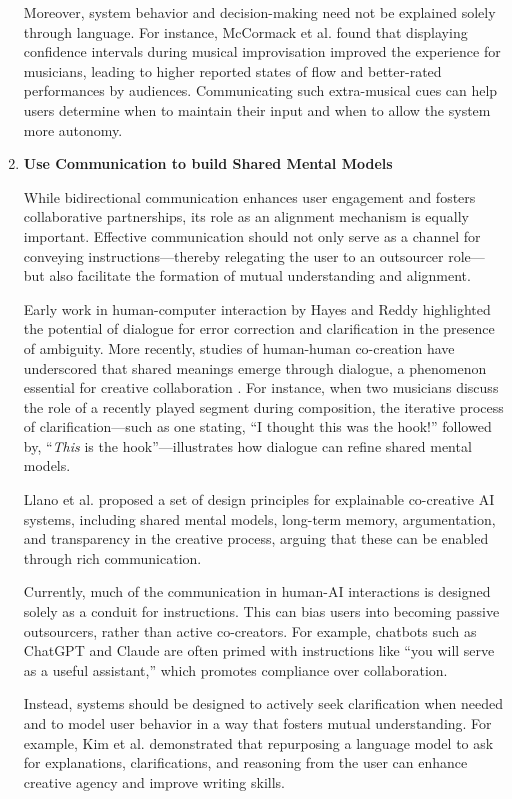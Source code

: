 \begin{enumerate}
Moreover, system behavior and decision-making need not be explained solely through language. For instance, McCormack et al. \cite{McCormack2019-yh} found that displaying confidence intervals during musical improvisation improved the experience for musicians, leading to higher reported states of flow and better-rated performances by audiences. Communicating such extra-musical cues can help users determine when to maintain their input and when to allow the system more autonomy.
    
\item \textbf{Use Communication to build Shared Mental Models}

While bidirectional communication enhances user engagement and fosters collaborative partnerships, its role as an alignment mechanism is equally important. Effective communication should not only serve as a channel for conveying instructions—thereby relegating the user to an outsourcer role—but also facilitate the formation of mutual understanding and alignment.

Early work in human-computer interaction by Hayes and Reddy \cite{Hayes1983-ca} highlighted the potential of dialogue for error correction and clarification in the presence of ambiguity. More recently, studies of human-human co-creation have underscored that shared meanings emerge through dialogue, a phenomenon essential for creative collaboration \cite{Bohm1996-fo}. For instance, when two musicians discuss the role of a recently played segment during composition, the iterative process of clarification—such as one stating, “I thought this was the hook!” followed by, “\textit{This} is the hook”—illustrates how dialogue can refine shared mental models.

Llano et al. \cite{Llano2022-ti} proposed a set of design principles for explainable co-creative AI systems, including shared mental models, long-term memory, argumentation, and transparency in the creative process, arguing that these can be enabled through rich communication.

Currently, much of the communication in human-AI interactions is designed solely as a conduit for instructions. This can bias users into becoming passive outsourcers, rather than active co-creators. For example, chatbots such as ChatGPT and Claude are often primed with instructions like “you will serve as a useful assistant,” which promotes compliance over collaboration.
 
 
Instead, systems should be designed to actively seek clarification when needed and to model user behavior in a way that fosters mutual understanding. For example, Kim et al. \cite{Kim2023-wt} demonstrated that repurposing a language model to ask for explanations, clarifications, and reasoning from the user can enhance creative agency and improve writing skills.


\end{enumerate}
